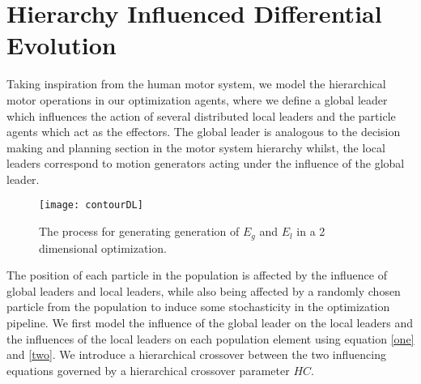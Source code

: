 \section{Hierarchy Influenced Differential Evolution}

Taking inspiration from the human motor system, we model the hierarchical motor operations in our optimization agents, where we define a global leader which influences the action of several distributed local leaders and the particle agents which act as the effectors. The global leader is analogous to the decision making and planning section in the motor system hierarchy whilst, the local leaders correspond to motion generators acting under the influence of the  global leader.

\begin{figure}[h!]
  \texttt{[image: contourDL]}
  \caption{The process for generating generation of $E_g$ and $E_l$ in a 2 dimensional optimization.}
  \label{fig:contourDL}
\end{figure}

The position of each particle in the population is affected by the influence of global leaders and local leaders, while also being affected by a randomly chosen particle from the population to induce some stochasticity in the optimization pipeline. We first model the influence of the global leader on the local leaders and the influences of the local leaders  on each population element using equation \eqref{one} and \eqref{two}. We introduce a hierarchical crossover between the two influencing equations governed by a hierarchical crossover parameter $HC$.


